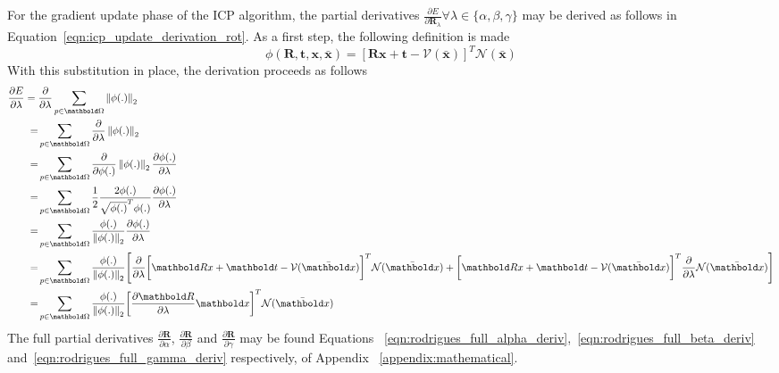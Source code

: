 For the gradient update phase of the ICP algorithm, the partial derivatives
\( \frac{\partial E}{\partial \bm{R}_{\lambda}} \forall \lambda \in \{\alpha, \beta, \gamma \} \) 
may be derived as follows in Equation~\ref{eqn:icp_update_derivation_rot}.
As a first step, the following definition is made
\begin{equation}
  \label{eqn:icp_deriv_sub}
  \phi(\bm{R}, \bm{t}, \bm{x}, \bar{\bm{x}}) =
  {\left[
    \bm{Rx} + \bm{t} - \mathcal{V}(\bar{\bm{x}})
  \right]}^{T}
  \mathcal{N}(\bar{\bm{x}})
\end{equation}
With this substitution in place, the derivation proceeds as follows
\begin{align}
  \label{eqn:icp_update_derivation_rot}
  \frac{\partial E}{\partial \lambda} ={}&
  \frac{\partial}{\partial \lambda}
  \sum_{p \in \bm{\Omega}}
  \norm{\phi(.)}\\
  =& \sum_{p \in \bm{\Omega}}
  \frac{\partial}{\partial \lambda}
  \norm{\phi(.)}\\
  =& \sum_{p \in \bm{\Omega}}
  \frac{\partial}{\partial \phi(.)} \norm{\phi(.)}
  \frac{\partial \phi(.)}{\partial \lambda}\\
  =& \sum_{p \in \bm{\Omega}}
  \frac{1}{2}{\frac{2 \phi(.)}{\sqrt{\phi(.)}^{T}\phi(.)}}
  \frac{\partial \phi(.)}{\partial \lambda}\\
  =& \sum_{p \in \bm{\Omega}}
  \frac{\phi(.)}{\norm{\phi(.)}}
  \frac{\partial \phi(.)}{\partial \lambda}\\
  =& \sum_{p \in \bm{\Omega}}
  \frac{\phi(.)}{\norm{\phi(.)}}
  \Bigg[ \frac{\partial}{\partial \lambda}
  {\bigg[ \bm{Rx} + \bm{t} - \mathcal{V}(\bar{\bm{x}}) \bigg]}^{T}
  \mathcal{N}(\bar{\bm{x}}) + 
  {\bigg[ \bm{Rx} + \bm{t} - \mathcal{V}(\bar{\bm{x}}) \bigg]}^{T}
  \frac{\partial}{\partial \lambda}
  \mathcal{N}(\bar{\bm{x}})\Bigg]\\
  =& \sum_{p \in \bm{\Omega}}
  \frac{\phi(.)}{\norm{\phi(.)}}
  {\bigg[ \frac{\partial \bm{R}}{\partial \lambda}
  \bm{x}\bigg]}^{T}
  \mathcal{N}(\bar{\bm{x}})
\end{align}
The full partial derivatives \(\frac{\partial \bm{R}}{\partial \alpha}\),
\(\frac{\partial \bm{R}}{\partial \beta}\) and
\(\frac{\partial \bm{R}}{\partial \gamma}\) may be found Equations
~\ref{eqn:rodrigues_full_alpha_deriv},~\ref{eqn:rodrigues_full_beta_deriv}
and~\ref{eqn:rodrigues_full_gamma_deriv} respectively, of Appendix 
~\ref{appendix:mathematical}.

